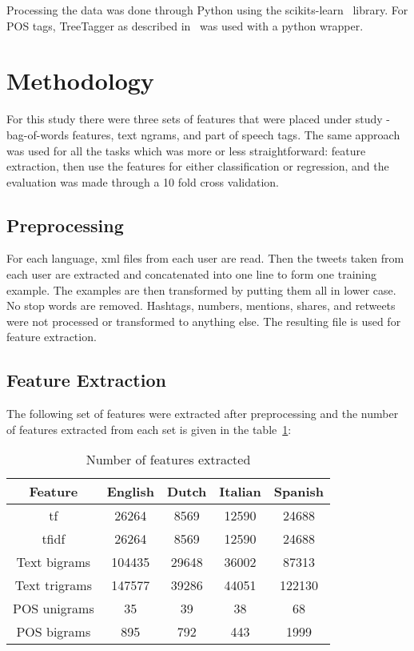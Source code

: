 \documentclass[a4paper]{llncs}
\begin{document}
Processing the data was done through Python using the scikits-learn~\cite{scikit-learn} library. For POS tags, TreeTagger as described in~\cite{schmid1994probabilistic} was used with a python wrapper. 

\section{Methodology}
For this study there were three sets of features that were placed under study - bag-of-words features, text ngrams, and  part of speech tags. The same approach was used for all the tasks which was more or less straightforward: feature extraction, then use the features for either classification or regression, and the evaluation was made through a 10 fold cross validation.
\subsection{Preprocessing}
For each language, xml files from each user are read. Then the tweets taken from each user are extracted and concatenated into one line to form one training example. The examples are then transformed by putting them all in lower case. No stop words are removed. Hashtags, numbers, mentions, shares, and retweets were not processed or transformed to anything else. The resulting file is used for feature extraction.  

\subsection{Feature Extraction}
The following set of features were extracted after preprocessing and the number of features extracted from each set is given in the table~\ref{table:numFeatures}: 

\begin{table}[!htbp]
\centering
\begin{tabular}{|c|cccc|}
\hline
Feature       & English & Dutch & Italian & Spanish \\ \hline
tf            & 26264   & 8569  & 12590   & 24688   \\ %
tfidf         & 26264   & 8569  & 12590   & 24688   \\ %
Text bigrams  & 104435  & 29648 & 36002   & 87313   \\ %
Text trigrams & 147577  & 39286 & 44051   & 122130  \\ %
POS unigrams  & 35      & 39    & 38      & 68      \\ %
POS bigrams   & 895     & 792   & 443     & 1999    \\ \hline
\end{tabular}
\caption{Number of features extracted}
\label{table:numFeatures}
\end{table}
\end{document}
